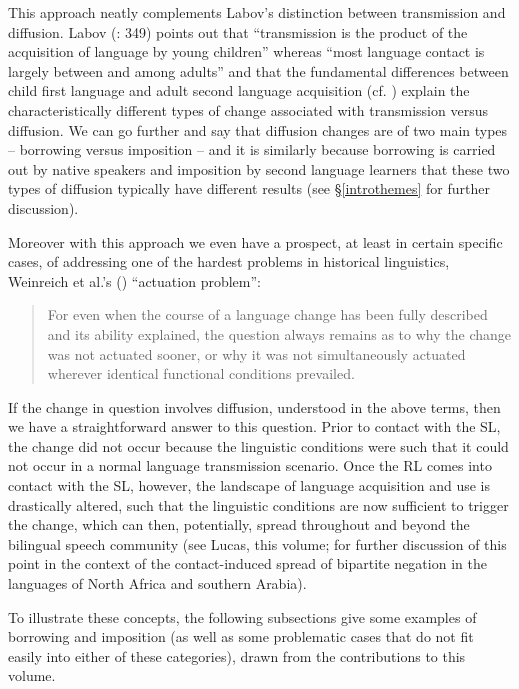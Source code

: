 \documentclass[output=paper]{langsci/langscibook}
\begin{document}
This approach neatly complements Labov's distinction between {transmission} and {diffusion}. Labov (\citeyear{Labov2007}: 349) points out that ``{transmission} is the product of the acquisition of language by young children'' whereas ``most language contact is largely between and among adults'' and that the fundamental differences between child first language and adult second language acquisition (cf. \citealt{BleyVroman1989,BleyVroman2009,Meisel2011}) explain the characteristically different types of change associated with {transmission} versus {diffusion}. We can go further and say that {diffusion} changes are of two main types -- borrowing versus {imposition} -- and it is similarly because borrowing is carried out by native speakers and {imposition} by second language learners that these two types of {diffusion} typically have different results (see §\ref{introthemes} for further discussion).

Moreover with this approach we even have a prospect, at least in certain specific cases, of addressing one of the hardest problems in historical linguistics, Weinreich et al.'s  (\citeyear{WeinreichLabovHerzog1968}) ``{actuation} problem'':

\begin{quote}
For even when the course of a  {language change} has been fully described and its ability explained, the question always remains as to why the change was not {actuated} sooner, or why it was not simultaneously {actuated} wherever identical functional conditions prevailed. \citep[112]{WeinreichLabovHerzog1968}
\end{quote}

\noindent If the change in question involves {diffusion}, understood in the above terms, then we have a straightforward answer to this question. Prior to contact with the {SL}, the change did not occur because the linguistic conditions were such that it could not occur in a normal language {transmission} scenario. Once the {RL} comes into contact with the {SL}, however, the landscape of language acquisition and use is drastically altered, such that the linguistic conditions are now sufficient to trigger the change, which can then, potentially, spread throughout and beyond the bilingual {speech community} (see Lucas, this volume; \citealt{LucasLash2010} for further discussion of this point in the context of the contact-induced spread of bipartite {negation} in the languages of North Africa and southern Arabia). 

To illustrate these concepts, the following subsections give some examples of borrowing and {imposition} (as well as some problematic cases that do not fit easily into either of these categories), drawn from the contributions to this volume.
\end{document}
